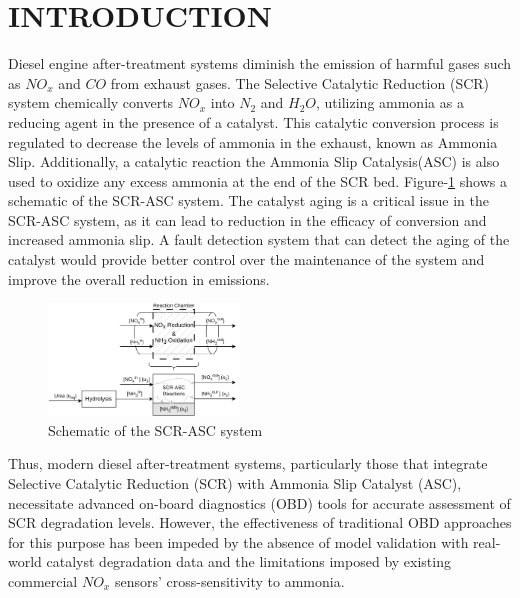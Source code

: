 \section{INTRODUCTION}

Diesel engine after-treatment systems diminish the emission of harmful gases such as $NO_x$ and $CO$ from exhaust gases.
The Selective Catalytic Reduction (SCR) system chemically converts $NO_x$ into $N_2$ and $H_2O$, utilizing ammonia as a
reducing agent in the presence of a catalyst. This catalytic conversion process is regulated to decrease the levels of
ammonia in the exhaust, known as Ammonia Slip. Additionally, a catalytic reaction the Ammonia Slip Catalysis(ASC) is
also used to oxidize any excess ammonia at the end of the SCR bed. Figure-\ref{fig:exhaust_scheme} shows a schematic of
the SCR-ASC system. The catalyst aging is a critical issue in the SCR-ASC system, as it can lead to reduction in the
efficacy of conversion and increased ammonia slip. A fault detection system that can detect the aging of the catalyst
would provide better control over the maintenance of the system and improve the overall reduction in emissions.

\begin{figure}[ht]
    \centering
    \includegraphics[width=0.45\textwidth]{./figs/1_intro/SCR-ASC_ModelReduction.png}
    \caption{Schematic of the SCR-ASC system}
    \label{fig:exhaust_scheme}
\end{figure}

Thus, modern diesel after-treatment systems, particularly those that integrate Selective Catalytic Reduction (SCR) with
Ammonia Slip Catalyst (ASC), necessitate advanced on-board diagnostics (OBD) tools for accurate assessment of SCR
degradation levels. However, the effectiveness of traditional OBD approaches for this purpose has been impeded by the
absence of model validation with real-world catalyst degradation data and the limitations imposed by existing commercial
$NO_x$ sensors' cross-sensitivity to ammonia.

